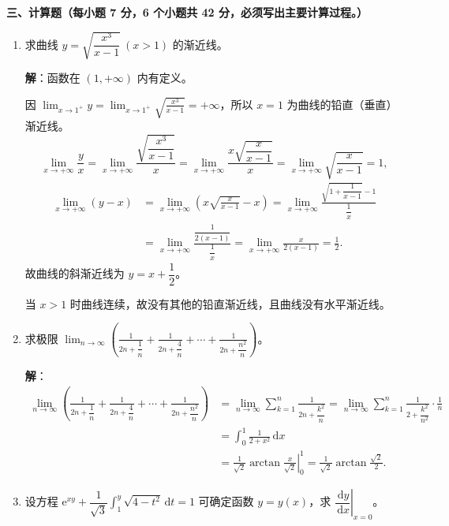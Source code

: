\documentclass[a4paper,11pt]{ctexart}
\newcommand{\dd}{\,\mathrm{d}}
\newcommand{\e}{\mathrm{e}}
\begin{document}
\vspace{0.6em}

\textbf{三、计算题（每小题 7 分，6 个小题共 42 分，必须写出主要计算过程。）}

\begin{enumerate}[label=\arabic*., start=11, leftmargin=2em, itemsep=0.9em, topsep=0.45em]
  \item 求曲线 $y=\sqrt{\dfrac{x^3}{x-1}}\ (x>1)$ 的渐近线。

  \textbf{解}：函数在 $(1,+\infty)$ 内有定义。

  因 $\displaystyle\lim_{x\to 1^+}y=\lim_{x\to 1^+}\sqrt{\frac{x^3}{x-1}}=+\infty$，所以 $x=1$ 为曲线的铅直（垂直）渐近线。
  \[
    \lim_{x\to+\infty}\frac{y}{x} = \lim_{x\to+\infty}\frac{\sqrt{\dfrac{x^3}{x-1}}}{x} = \lim_{x\to+\infty}\frac{x\sqrt{\dfrac{x}{x-1}}}{x} = \lim_{x\to+\infty}\sqrt{\frac{x}{x-1}} = 1,
  \]
  \begin{align*}
    \lim_{x\to+\infty}(y-x) &= \lim_{x\to+\infty}\left(x\sqrt{\frac{x}{x-1}}-x\right)
    = \lim_{x\to+\infty}\frac{\sqrt{1+\dfrac{1}{x-1}}-1}{\dfrac{1}{x}} \\
    &= \lim_{x\to+\infty}\frac{\dfrac{1}{2(x-1)}}{\dfrac{1}{x}}
    = \lim_{x\to+\infty}\frac{x}{2(x-1)} = \frac{1}{2}.
  \end{align*}
  故曲线的斜渐近线为 $y=x+\dfrac{1}{2}$。

  当 $x>1$ 时曲线连续，故没有其他的铅直渐近线，且曲线没有水平渐近线。

  \item 求极限 $\displaystyle\lim_{n\to\infty}\left(\frac{1}{2n+\dfrac{1}{n}}+\frac{1}{2n+\dfrac{4}{n}}+\cdots+\frac{1}{2n+\dfrac{n^2}{n}}\right)$。

  \textbf{解}：
  \begin{align*}
    \lim_{n\to\infty}\left(\frac{1}{2n+\dfrac{1}{n}}+\frac{1}{2n+\dfrac{4}{n}}+\cdots+\frac{1}{2n+\dfrac{n^2}{n}}\right)
    &= \lim_{n\to\infty}\sum_{k=1}^n\frac{1}{2n+\dfrac{k^2}{n}}
     = \lim_{n\to\infty}\sum_{k=1}^n\frac{1}{2+\dfrac{k^2}{n^2}}\cdot\frac{1}{n} \\
    &= \int_0^1\frac{1}{2+x^2}\dd x \\
    &= \left.\frac{1}{\sqrt{2}}\arctan\frac{x}{\sqrt{2}}\right|_0^1 = \frac{1}{\sqrt{2}}\arctan\frac{\sqrt{2}}{2}.
  \end{align*}

  \item 设方程 $\e^{xy}+\dfrac{1}{\sqrt{3}}\displaystyle\int_1^y\sqrt{4-t^2}\dd t=1$ 可确定函数 $y=y(x)$，求 $\left.\dfrac{\dd y}{\dd x}\right|_{x=0}$。


\end{enumerate}
\end{document}
